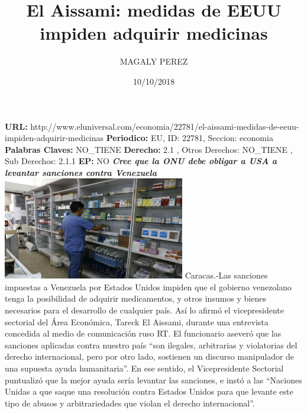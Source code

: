 \documentclass{article}%
\title{\textbf{El Aissami: medidas de EEUU impiden adquirir medicinas}}%
\author{MAGALY PEREZ}%
\date{10/10/2018}%
\begin{document}
%
\normalsize%
\maketitle%
\textbf{URL: }%
http://www.eluniversal.com/economia/22781/el{-}aissami{-}medidas{-}de{-}eeuu{-}impiden{-}adquirir{-}medicinas\newline%
%
\textbf{Periodico: }%
EU, %
ID: %
22781, %
Seccion: %
economia\newline%
%
\textbf{Palabras Claves: }%
NO\_TIENE\newline%
%
\textbf{Derecho: }%
2.1%
, Otros Derechos: %
NO\_TIENE%
, Sub Derechos: %
2.1.1%
\newline%
%
\textbf{EP: }%
NO\newline%
\newline%
%
\textbf{\textit{Cree que la ONU debe obligar a USA a levantar sanciones contra Venezuela}}%
\newline%
\newline%
%
\includegraphics[width=300px]{205.jpg}%
\newline%
%
Caracas.{-}Las sanciones impuestas a Venezuela por Estados Unidos impiden que el gobierno venezolano tenga la posibilidad de adquirir medicamentos, y otros insumos y bienes necesarios para el desarrollo de cualquier país.%
\newline%
%
Así lo afirmó el vicepresidente sectorial del Área Económica, Tareck El Aissami, durante una entrevista concedida al medio de comunicación ruso RT.%
\newline%
%
El funcionario aseveró que las sanciones aplicadas contra nuestro país “son ilegales, arbitrarias y violatorias del derecho internacional, pero por otro lado, sostienen un discurso manipulador de una supuesta ayuda humanitaria”.%
\newline%
%
En ese sentido, el Vicepresidente Sectorial puntualizó que la mejor ayuda sería levantar las sanciones, e instó a las “Naciones Unidas a que saque una resolución contra Estados Unidos para que levante este tipo de abusos y arbitrariedades que violan el derecho internacional”.%
\end{document}
